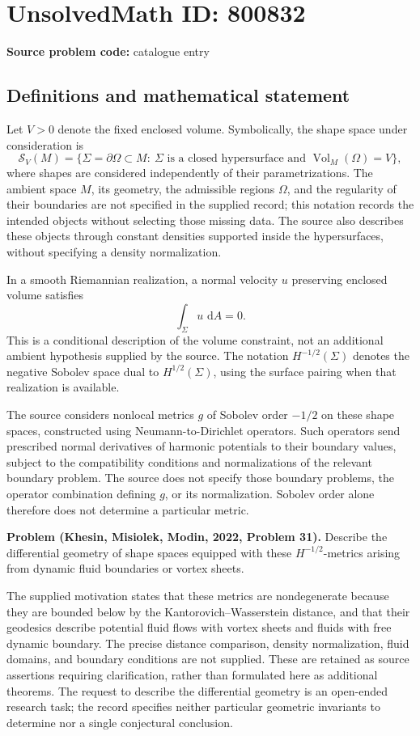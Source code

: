 \documentclass[11pt]{article}
\newcommand{\dd}{\,\mathrm{d}}
\begin{document}
\section*{UnsolvedMath ID: 800832}
\textbf{Source problem code:} catalogue entry
\subsection{Definitions and mathematical statement}
Let \(V>0\) denote the fixed enclosed volume. Symbolically, the shape space under consideration is
\[
\mathcal S_V(M)=\{\Sigma=\partial\Omega\subset M:\ \Sigma\text{ is a closed hypersurface and }\operatorname{Vol}_M(\Omega)=V\},
\]
where shapes are considered independently of their parametrizations. The ambient space \(M\), its geometry, the admissible regions \(\Omega\), and the regularity of their boundaries are not specified in the supplied record; this notation records the intended objects without selecting those missing data. The source also describes these objects through constant densities supported inside the hypersurfaces, without specifying a density normalization.

In a smooth Riemannian realization, a normal velocity \(u\) preserving enclosed volume satisfies
\[
\int_\Sigma u\,\dd A=0.
\]
This is a conditional description of the volume constraint, not an additional ambient hypothesis supplied by the source. The notation \(H^{-1/2}(\Sigma)\) denotes the negative Sobolev space dual to \(H^{1/2}(\Sigma)\), using the surface pairing when that realization is available.

The source considers nonlocal metrics \(g\) of Sobolev order \(-1/2\) on these shape spaces, constructed using Neumann-to-Dirichlet operators. Such operators send prescribed normal derivatives of harmonic potentials to their boundary values, subject to the compatibility conditions and normalizations of the relevant boundary problem. The source does not specify those boundary problems, the operator combination defining \(g\), or its normalization. Sobolev order alone therefore does not determine a particular metric.

\textbf{Problem (Khesin, Misiolek, Modin, 2022, Problem 31).} Describe the differential geometry of shape spaces equipped with these \(H^{-1/2}\)-metrics arising from dynamic fluid boundaries or vortex sheets.

The supplied motivation states that these metrics are nondegenerate because they are bounded below by the Kantorovich--Wasserstein distance, and that their geodesics describe potential fluid flows with vortex sheets and fluids with free dynamic boundary. The precise distance comparison, density normalization, fluid domains, and boundary conditions are not supplied. These are retained as source assertions requiring clarification, rather than formulated here as additional theorems. The request to describe the differential geometry is an open-ended research task; the record specifies neither particular geometric invariants to determine nor a single conjectural conclusion.
\end{document}
